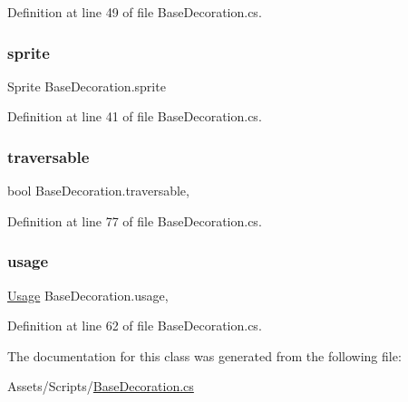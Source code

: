 Definition at line 49 of file Base\+Decoration.\+cs.

\mbox{\label{class_base_decoration_a784d075121ac6fb2360c45ae7f7ec6ad}} 
\subsubsection{\texorpdfstring{sprite}{sprite}}
{\footnotesize\ttfamily Sprite Base\+Decoration.\+sprite\hspace{0.3cm}{\ttfamily [get]}}



Definition at line 41 of file Base\+Decoration.\+cs.

\mbox{\label{class_base_decoration_ab85285ed546a07d59b797491f03f857f}} 
\subsubsection{\texorpdfstring{traversable}{traversable}}
{\footnotesize\ttfamily bool Base\+Decoration.\+traversable\hspace{0.3cm}{\ttfamily [get]}, {\ttfamily [set]}}



Definition at line 77 of file Base\+Decoration.\+cs.

\mbox{\label{class_base_decoration_a502a5352e9f53da746d96a75ff31c3f0}} 
\subsubsection{\texorpdfstring{usage}{usage}}
{\footnotesize\ttfamily \mbox{\hyperlink{class_base_decoration_ad8b9ff9e5d7dc488ca94fed2efa45a6e}{Usage}} Base\+Decoration.\+usage\hspace{0.3cm}{\ttfamily [get]}, {\ttfamily [set]}}



Definition at line 62 of file Base\+Decoration.\+cs.



The documentation for this class was generated from the following file\+:\begin{DoxyCompactItemize}
\item 
Assets/\+Scripts/\mbox{\hyperlink{_base_decoration_8cs}{Base\+Decoration.\+cs}}\end{DoxyCompactItemize}
